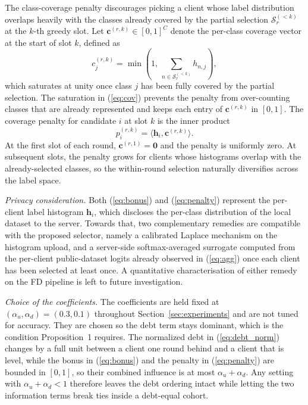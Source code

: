 \documentclass[journal]{IEEEtran}
\newcommand{\new}[1]{#1}
\newcommand{\rev}[1]{#1}
\begin{document}
The class-coverage penalty discourages picking a client whose label distribution overlaps heavily with the classes already covered by the partial selection $\mathcal{S}_r^{(<k)}$ at the $k$-th greedy slot. Let $\bm{c}^{(r,k)} \in [0,1]^{C}$ denote the per-class coverage vector at the start of slot $k$, defined as
\begin{equation}
c_{j}^{(r,k)} = \min\!\left(1,\, \sum_{n \in \mathcal{S}_r^{(<k)}} h_{n,j}\right),
\label{eq:cov}
\end{equation}
which saturates at unity once class $j$ has been fully covered by the partial selection. The saturation in (\ref{eq:cov}) prevents the penalty from over-counting classes that are already represented and keeps each entry of $\bm{c}^{(r,k)}$ in $[0,1]$. The coverage penalty for candidate $i$ at slot $k$ is the inner product
\begin{equation}
p_i^{(r,k)} = \langle \bm{h}_i, \bm{c}^{(r,k)} \rangle.
\label{eq:penalty}
\end{equation}
At the first slot of each round, $\bm{c}^{(r,1)} = \bm{0}$ and the penalty is uniformly zero. At subsequent slots, the penalty grows for clients whose histograms overlap with the already-selected classes, so the within-round selection naturally diversifies across the label space.

\new{\textit{Privacy consideration.} Both (\ref{eq:bonus}) and (\ref{eq:penalty}) represent the per-client label histogram $\bm{h}_i$, which discloses the per-class distribution of the local dataset to the server. Towards that, two complementary remedies are compatible with the proposed selector, namely a calibrated Laplace mechanism on the histogram upload, and a server-side softmax-averaged surrogate computed from the per-client public-dataset logits already observed in (\ref{eq:agg}) once each client has been selected at least once. A quantitative characterisation of either remedy on the FD pipeline is left to future investigation.}

\rev{\textit{Choice of the coefficients.} The coefficients are held fixed at $(\alpha_u, \alpha_d) = (0.3, 0.1)$ throughout Section~\ref{sec:experiments} and are not tuned for accuracy. They are chosen so the debt term stays dominant, which is the condition Proposition~1 requires. The normalized debt in (\ref{eq:debt_norm}) changes by a full unit between a client one round behind and a client that is level, while the bonus in (\ref{eq:bonus}) and the penalty in (\ref{eq:penalty}) are bounded in $[0,1]$, so their combined influence is at most $\alpha_u + \alpha_d$. Any setting with $\alpha_u + \alpha_d < 1$ therefore leaves the debt ordering intact while letting the two information terms break ties inside a debt-equal cohort.}
\end{document}
